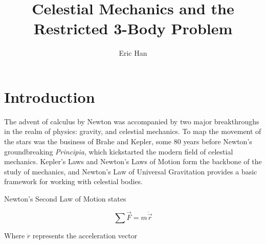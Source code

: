 \documentclass{article}
\title{Celestial Mechanics and the Restricted 3-Body Problem}
\author{Eric Han}
\begin{document}
\maketitle


\section{Introduction}

The advent of calculus by Newton was accompanied by two major breakthroughs in the realm of physics: gravity, and celestial mechanics. To map the movement of the stars was the business of Brahe and Kepler, some 80 years before Newton's groundbreaking \textit{Principia}, which kickstarted the modern field of celestial mechanics. Kepler's Laws and Newton's Laws of Motion form the backbone of the study of mechanics, and Newton's Law of Universal Gravitation provides a basic framework for working with celestial bodies.

Newton's Second Law of Motion states

$$
\sum{\vec{F}} = m \ddot{\vec{r}}
$$

Where $\ddot{r}$ represents the acceleration vector 





\end{document}
